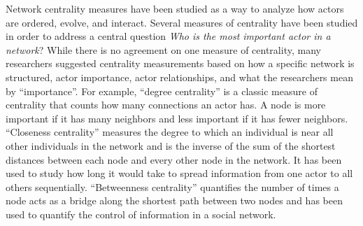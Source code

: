 \documentclass{article}
\theoremstyle{definition}
\theoremstyle{remark}
\begin{document}
Network centrality measures have been studied as a way to analyze how actors are ordered, evolve, and interact.  Several measures of centrality have been studied in order to address a central question \textit{Who is the most important actor in a network}?  While there is no agreement on one measure of centrality, many researchers suggested centrality measurements based on how a specific network is structured, actor importance, actor relationships, and what the researchers mean by ``importance''.  For example, ``degree centrality'' is a classic measure of centrality that counts how many connections an actor has.  A node is more important if it has many neighbors and less important if it has fewer neighbors.  ``Closeness centrality'' measures the degree to which an individual is near all other individuals in the network and is the inverse of the sum of the shortest distances between each node and every other node in the network.  It has been used to study how long it would take to spread information from one actor to all others sequentially.  ``Betweenness centrality'' quantifies the number of times a node acts as a bridge along the shortest path between two nodes and has been used to quantify the control of information in a social network. \\
\end{document}
